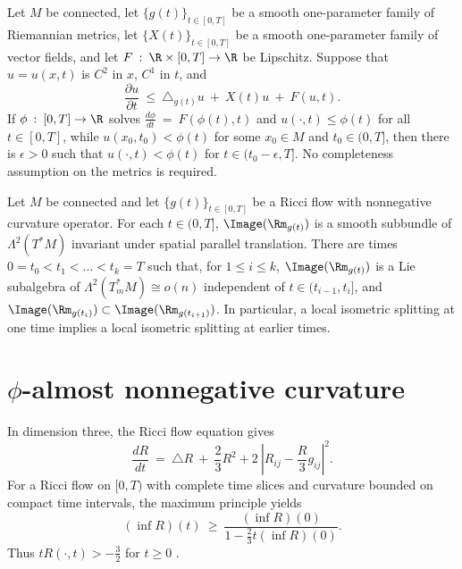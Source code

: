 \begin{theorem}
  \label{thm:kl-maximum-principles-existence-maximum-principles}

Let $M$ be connected, let $\{g(t)\}_{t\in[0,T]}$ be a smooth one-parameter
family of Riemannian metrics, let $\{X(t)\}_{t\in[0,T]}$ be a smooth
one-parameter family of vector fields, and let
$F\: : \:\R\times[0,T]\rightarrow\R$ be Lipschitz. Suppose that $u=u(x,t)$
is $C^2$ in $x$, $C^1$ in $t$, and
\begin{equation}
\frac{\partial u}{\partial t}\: \le \:\triangle_{g(t)}u\:+\:X(t)u\:+\:F(u,t).
\end{equation}
If $\phi\: : \:[0,T]\rightarrow\R$ solves
$\frac{d\phi}{dt}\:=\:F(\phi(t),t)$ and
$u(\cdot,t)\leq\phi(t)$ for all $t\in[0,T]$, while
$u(x_0,t_0)<\phi(t)$ for some $x_0\in M$ and $t_0\in(0,T]$, then there is
$\epsilon>0$ such that $u(\cdot,t)<\phi(t)$ for
$t\in(t_0-\epsilon,T]$.
No completeness assumption on the metrics is required.
\end{theorem}

\begin{theorem}
  \label{thm:kl-maximum-principles-existence-curvature-operators}
 \label{splitting}

Let $M$ be connected and let $\{g(t)\}_{t\in[0,T]}$ be a Ricci flow with
nonnegative curvature operator. For each $t\in(0,T]$,
$\Image(\Rm_{g(t)})$ is a smooth subbundle of $\Lambda^2(T^*M)$ invariant
under spatial parallel translation. There are times
$0=t_0<t_1<\ldots<t_k=T$ such that, for $1\leq i\leq k$,
$\Image(\Rm_{g(t)})$ is a Lie subalgebra of
$\Lambda^2(T^*_mM)\cong o(n)$ independent of $t\in(t_{i-1},t_i]$, and
$\Image(\Rm_{g(t_i)})\subset\Image(\Rm_{g(t_{i+1})})$.
In particular, a local isometric splitting at one time implies a local
isometric splitting at earlier times.
\end{theorem}

\section{$\phi$-almost nonnegative curvature}
\label{phiappendix}

In dimension three, the Ricci flow equation gives
\begin{equation} \label{3dR}
\frac{dR}{dt} \: = \: \triangle R \: + \: \frac{2}{3}R^2
+2\:|R_{ij}-\frac{R}{3}g_{ij}|^2.
\end{equation}
For a Ricci flow on $[0,T)$ with complete time slices and curvature bounded
on compact time intervals, the maximum principle yields
\begin{equation} \label{Rlowerbound}
(\inf R)(t)\: \ge \:
\frac{(\inf R)(0)}{1-\frac23t(\inf R)(0)}.
\end{equation}
Thus $tR(\cdot,t)>-\frac32$ for $t\geq0$ \cite[Section 2]{Hamiltonn}.

